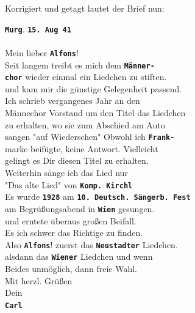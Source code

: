\documentclass[12pt, a4paper, ngerman, bidi=default]{article}
\begin{document}
Korrigiert und getagt lautet der Brief nun:
\begin{tcolorbox}[colback=oldLetter, colframe=black, sharp corners, width=\textwidth]
  \textbf{\colorbox{place}{\texttt{Murg}}}.  \textbf{\colorbox{date}{\texttt{15. Aug 41}}} \\
\\
Mein lieber  \textbf{\colorbox{person}{\texttt{Alfons}}}!\\
Seit langem treibt es mich dem  \textbf{\colorbox{organization}{\texttt{Männer-}}}\\
\textbf{\colorbox{organization}{\texttt{chor}}} wieder einmal ein Liedchen zu stiften.\\
und kam mir die günstige Gelegenheit passend.\\
Ich schrieb vergangenes Jahr an den\\
Männechor Vorstand um den Titel das Liedchen\\
zu erhalten, wo sie zum Abschied am Auto \\
sangen "auf Wiederschen" Obwohl ich  \textbf{\colorbox{unclear}{\texttt{Frank-}}}\\
marke beifügte, keine Antwort. Vielleicht\\
gelingt es Dir diesen Titel zu erhalten.\\
Weiterhin sänge ich das Lied nur\\
"Das alte Lied" von  \textbf{\colorbox{abbrev}{\texttt{Komp.}}}\textbf{\colorbox{person}{\texttt{ Kirchl}}}\\
Es wurde \textbf{\colorbox{date}{\texttt{1928}}} am \textbf{\colorbox{eventTag}{\texttt{10. Deutsch. Sängerb. Fest}}}\\
am Begrüßungsabend in \textbf{\colorbox{place}{\texttt{Wien}}} gesungen.\\
und erntete überaus großen Beifall.\\
Es ich schwer das Richtige zu finden.\\
Also \textbf{\colorbox{person}{\texttt{Alfons}}}! zuerst das \textbf{\colorbox{place}{\texttt{Neustadter}}} Liedchen.\\
alsdann das \textbf{\colorbox{place}{\texttt{Wiener}}} Liedchen und wenn\\
Beides unmöglich, dann freie Wahl.\\
Mit herzl. Grüßen \\
Dein\\
\textbf{\colorbox{person}{\texttt{Carl}}}\\
\end{tcolorbox}
\end{document}
